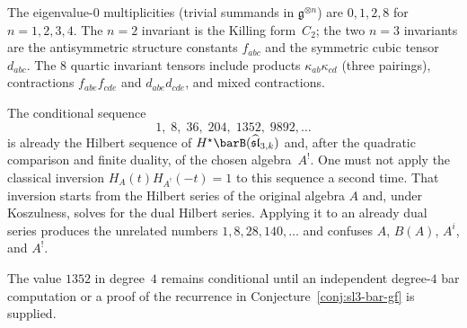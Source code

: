 \begin{computation}
The eigenvalue-$0$ multiplicities (trivial summands in $\mathfrak{g}^{\otimes n}$)
are $0, 1, 2, 8$ for $n = 1, 2, 3, 4$. The $n=2$ invariant is the
Killing form~$C_2$; the two $n=3$ invariants are the antisymmetric
structure constants $f_{abc}$ and the symmetric cubic tensor $d_{abc}$.
The $8$ quartic invariant tensors include products $\kappa_{ab}\kappa_{cd}$
(three pairings), contractions $f_{abe}f_{cde}$ and $d_{abe}d_{cde}$,
and mixed contractions.
\end{computation}

\begin{remark}
\label{rem:sl3-koszul-dual}

The conditional sequence
\[
1,\;8,\;36,\;204,\;1352,\;9892,\ldots
\]
is already the Hilbert sequence of
$H^\star\barB(\widehat{\mathfrak{sl}}_{3,k})$ and, after the
quadratic comparison and finite duality, of the chosen algebra~$A^!$.
One must not apply the classical inversion
$H_A(t)H_{A^!}(-t)=1$ to this sequence a second time. That inversion
starts from the Hilbert series of the original algebra $A$ and, under
Koszulness, solves for the dual Hilbert series. Applying it to an
already dual series produces the unrelated numbers
$1,8,28,140,\ldots$ and confuses $A$, $B(A)$, $A^i$, and $A^!$.

The value $1352$ in degree~$4$ remains conditional until an
independent degree-$4$ bar computation or a proof of the recurrence
in Conjecture~\ref{conj:sl3-bar-gf} is supplied.
\end{remark}

